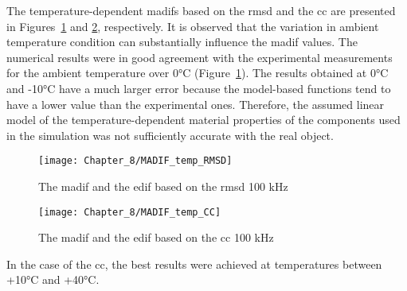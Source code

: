 The temperature-dependent \acp{madif} based on the \ac{rmsd} and the \ac{cc} are presented in Figures~\ref{fig:madif_temp_rmsd} and \ref{fig:madif_temp_cc}, respectively.
It is observed that the variation in ambient temperature condition can substantially influence the \ac{madif} values.
The numerical results were in good agreement with the experimental measurements for the ambient temperature over 0\unit{\degreeCelsius} (Figure~\ref{fig:madif_temp_rmsd}).
The results obtained at 0\unit{\degreeCelsius} and -10\unit{\degreeCelsius} have a much larger error because the model-based functions tend to have a lower value than the experimental ones.
Therefore, the assumed linear model of the temperature-dependent material properties of the components used in the simulation was not sufficiently accurate with the real object.
\begin{figure}[!tbh]
	\begin{center}
		\texttt{[image: Chapter\_8/MADIF\_temp\_RMSD]}
	\end{center}
	\caption{The \acf{madif} and the \acf{edif} based on the \acf{rmsd} 100 \unit{\kHz}}
	\label{fig:madif_temp_rmsd}
\end{figure}
\begin{figure}
	\begin{center}
		\texttt{[image: Chapter\_8/MADIF\_temp\_CC]}
	\end{center}
	\caption{The \acf{madif} and the \acf{edif} based on the \acf{cc} 100 \unit{\kHz}}
	\label{fig:madif_temp_cc}
\end{figure}
In the case of the \ac{cc}, the best results were achieved at temperatures between +10\unit{\degreeCelsius} and +40\unit{\degreeCelsius}.
\clearpage